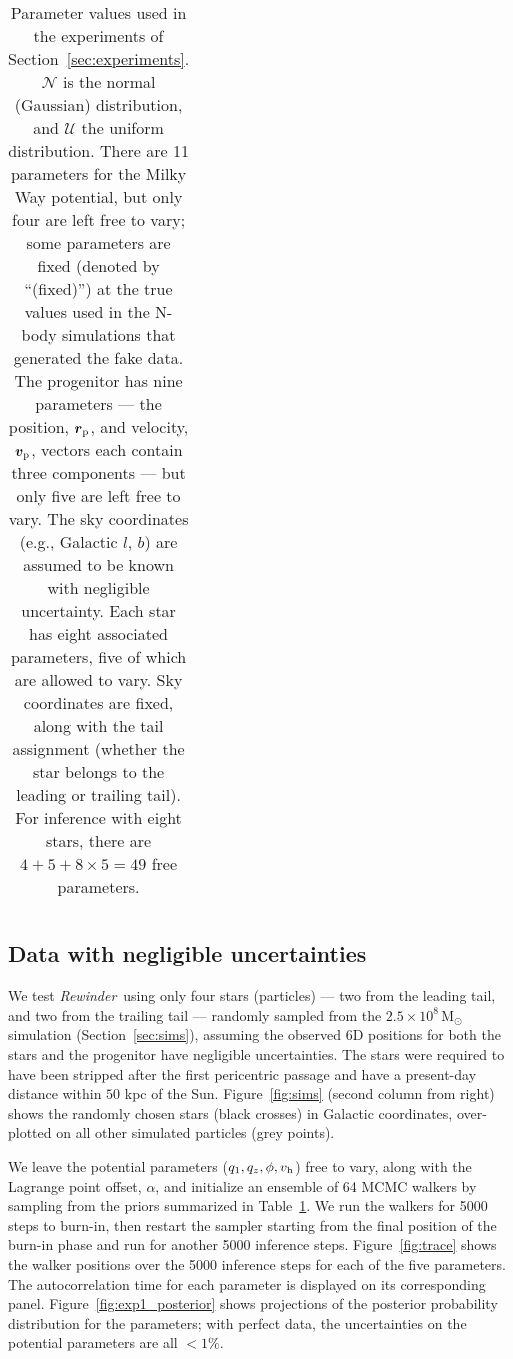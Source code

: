 \documentclass[letterpaper,12pt,preprint]{aastex}
\newcommand{\msun}{\mathrm{M}_\odot}
\newcommand{\bs}{\boldsymbol}
\newcommand{\Loffset}{\alpha}
\newcommand{\vhalo}{v_{\rm h}}
\newcommand{\rewinder}{\emph{Rewinder}}
\begin{document}
\begin{table}[h]
\begin{center}
\begin{tabular}{l c c l}
		\bottomrule
		\end{tabular}
	\caption{Parameter values used in the experiments of Section~\ref{sec:experiments}. $\mathcal{N}$ is the normal (Gaussian) distribution, and $\mathcal{U}$ the uniform distribution. There are 11 parameters for the Milky Way potential, but only four are left free to vary; some parameters are fixed (denoted by ``(fixed)'') at the true values used in the N-body simulations that generated the fake data. The progenitor has nine parameters --- the position, $\bs{r}_{\rm p}$, and velocity, $\bs{v}_{\rm p}$, vectors each contain three components --- but only five are left free to vary. The sky coordinates (e.g., Galactic $l$, $b$) are assumed to be known with negligible uncertainty. Each star has eight associated parameters, five of which are allowed to vary. Sky coordinates are fixed, along with the tail assignment (whether the star belongs to the leading or trailing tail). For inference with eight stars, there are $4+5+8\times5=49$ free parameters. \label{tbl:params}}
\end{center}
\end{table}

\subsection{Data with negligible uncertainties}\label{sec:exp1}

We test \rewinder\ using only four stars (particles) --- two from the leading tail, and two from the trailing tail --- randomly sampled from the $2.5\times10^8\,\msun$ simulation (Section~\ref{sec:sims}), assuming the observed 6D positions for both the stars and the progenitor have negligible uncertainties. The stars were required to have been stripped after the first pericentric passage and have a present-day distance within $50$ kpc of the Sun. Figure~\ref{fig:sims} (second column from right) shows the randomly chosen stars (black crosses) in Galactic coordinates, over-plotted on all other simulated particles (grey points). 

We leave the potential parameters ($q_1,q_z,\phi,\vhalo$) free to vary, along with the Lagrange point offset, $\Loffset$, and initialize an ensemble of 64 MCMC walkers by sampling from the priors summarized in Table~\ref{tbl:params}. We run the walkers for 5000 steps to burn-in, then restart the sampler starting from the final position of the burn-in phase and run for another 5000 inference steps. Figure~\ref{fig:trace} shows the walker positions over the 5000 inference steps for each of the five parameters. The autocorrelation time for each parameter is displayed on its corresponding panel. Figure~\ref{fig:exp1_posterior} shows projections of the posterior probability distribution for the parameters; with perfect data, the uncertainties on the potential parameters are all $<1\%$.
\end{document}
